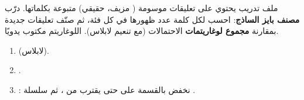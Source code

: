 \begin{statement}
ملف تدريب  يحتوي على تعليقات موسومة ( مزيف،  حقيقي) متبوعة بكلماتها. درّب \textbf{مصنف بايز الساذج}: احسب لكل كلمة عدد ظهورها في كل فئة، ثم صنّف تعليقات جديدة بمقارنة \textbf{مجموع لوغاريتمات} الاحتمالات (مع تنعيم لابلاس). اللوغاريتم مكتوب يدويًا.
\end{statement}
\begin{stepsbox}\begin{enumerate}
\item \par{\centering\small{}\par} (لابلاس).
\item \par{\centering\small{}\par}.
\item {}: نخفض  بالقسمة على  حتى يقترب من ، ثم سلسلة .
\end{enumerate}\end{stepsbox}
